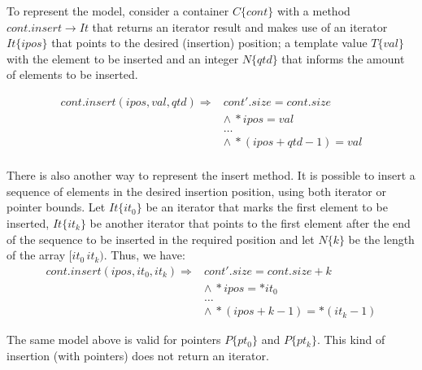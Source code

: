 \documentclass[a4paper]{llncs}
\begin{document}
To represent the model, consider a container $C\{cont\}$ with a
method $cont.insert \rightarrow It$ that returns an iterator result and
makes use of an iterator $It\{ipos\}$ that points to the desired
(insertion) position; a template value $T\{val\}$ with the element
to be inserted and an integer $N\{qtd\}$ that informs the amount
of elements to be inserted.

\[\begin{array}{ll}
cont.insert(ipos, val, qtd) \Longrightarrow & cont'.size = cont.size \\
  & \wedge \: *ipos = val \\
  & \ldots \\
  & \wedge \: *(ipos + qtd - 1) = val \\
\end{array}\]

There is also another way to represent the insert method.
It is possible to insert a sequence of elements in the desired
insertion position, using both iterator or pointer bounds.
Let $It\{it_0\}$ be an iterator that marks the first element
to be inserted, $It\{it_k\}$ be another iterator that
points to the first element after the end of the sequence to be inserted
in the required position and let $N\{k\}$ be the length of the array $[it_0\, it_k)$.
Thus, we have:
%
\[\begin{array}{ll}
cont.insert(ipos, it_0, it_k) \Longrightarrow & cont'.size = cont.size + k\\
  & \wedge \: *ipos = *it_0 \\
  & \ldots \\
  & \wedge \: *(ipos + k - 1) = *(it_k - 1)
\end{array}\]

The same model above is valid for pointers $P\{pt_0\}$ and $P\{pt_k\}$.
This kind of insertion (with pointers) does not return an iterator.
\end{document}
